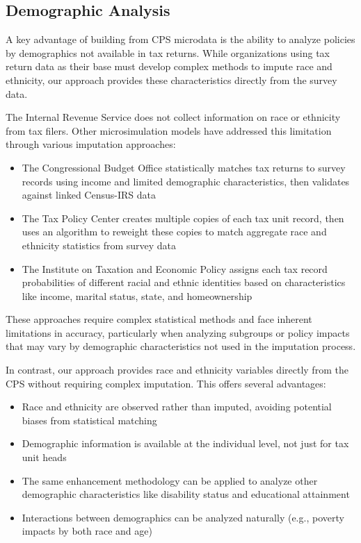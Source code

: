 \subsection{Demographic Analysis}

A key advantage of building from CPS microdata is the ability to analyze policies by demographics not available in tax returns. While organizations using tax return data as their base must develop complex methods to impute race and ethnicity, our approach provides these characteristics directly from the survey data.

The Internal Revenue Service does not collect information on race or ethnicity from tax filers. Other microsimulation models have addressed this limitation through various imputation approaches:

\begin{itemize}
    \item The Congressional Budget Office statistically matches tax returns to survey records using income and limited demographic characteristics, then validates against linked Census-IRS data \citep{cbo2024race}
    \item The Tax Policy Center creates multiple copies of each tax unit record, then uses an algorithm to reweight these copies to match aggregate race and ethnicity statistics from survey data \citep{khitatrakun2023race}
    \item The Institute on Taxation and Economic Policy assigns each tax record probabilities of different racial and ethnic identities based on characteristics like income, marital status, state, and homeownership \citep{itep2024race}
\end{itemize}

These approaches require complex statistical methods and face inherent limitations in accuracy, particularly when analyzing subgroups or policy impacts that may vary by demographic characteristics not used in the imputation process.

In contrast, our approach provides race and ethnicity variables directly from the CPS without requiring complex imputation. This offers several advantages:

\begin{itemize}
    \item Race and ethnicity are observed rather than imputed, avoiding potential biases from statistical matching
    \item Demographic information is available at the individual level, not just for tax unit heads
    \item The same enhancement methodology can be applied to analyze other demographic characteristics like disability status and educational attainment
    \item Interactions between demographics can be analyzed naturally (e.g., poverty impacts by both race and age)
\end{itemize}

